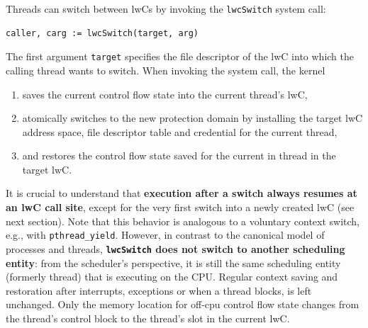 \documentclass[10pt,twocolumn,a4paper]{article}
\begin{document}
Threads can switch between lwCs by invoking the \lstinline{lwcSwitch} system call:

\begin{lstlisting}[style=syscallinline]
  caller, carg := lwcSwitch(target, arg) 
\end{lstlisting}

The first argument \lstinline{target} specifies the file descriptor of the lwC into which the calling thread wants to switch.
When invoking the system call, the kernel
\begin{enumerate}[nosep,label=(\alph*)]
\item saves the current control flow state into the current thread's lwC,
\item atomically switches to the new protection domain by installing the target lwC address space, file descriptor table and credential for the current thread,
\item and restores the control flow state saved for the current in thread in the target lwC.
\end{enumerate}
\cite{lwckernelrepo,lwcpaper}


It is crucial to understand that \textbf{execution after a switch always resumes at an lwC call site}, except for the very first switch into a newly created lwC (see next section).
Note that this behavior is analogous to a voluntary context switch, e.g., with \lstinline{pthread_yield}.
However, in contrast to the canonical model of processes and threads, \textbf{\lstinline{lwcSwitch} does not switch to another scheduling entity}:
from the scheduler's perspective, it is still the same scheduling entity (formerly thread) that is executing on the CPU.
Regular context saving and restoration after interrupts, exceptions or when a thread blocks, is left unchanged.
Only the memory location for off-cpu control flow state changes from the thread's control block to the thread's slot in the current lwC.
\cite{lwckernelrepo}
\end{document}
